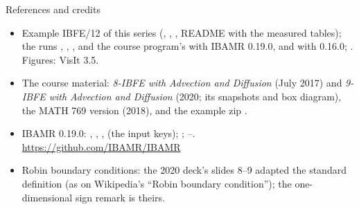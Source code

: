 \documentclass[aspectratio=169,11pt]{beamer}
\begin{document}
\begin{frame}{References and credits}
\label{fr:refs}
\scriptsize
\begin{itemize}
  \item Example IBFE/12 of this series (, , , README with the measured tables); the runs , , ,  and the course program's  with IBAMR 0.19.0, and  with 0.16.0; . Figures: VisIt 3.5.
  \item The course material: \emph{8-IBFE with Advection and Diffusion} (July 2017) and \emph{9-IBFE with Advection and Diffusion} (2020; its snapshots and box diagram), the MATH 769 version (2018), and the example zip .
  \item IBAMR 0.19.0: , , ,  (the input keys); ; --. \url{https://github.com/IBAMR/IBAMR}
  \item Robin boundary conditions: the 2020 deck's slides 8--9 adapted the standard definition (as on Wikipedia's ``Robin boundary condition''); the one-dimensional sign remark is theirs.
\end{itemize}
\end{frame}
\end{document}
